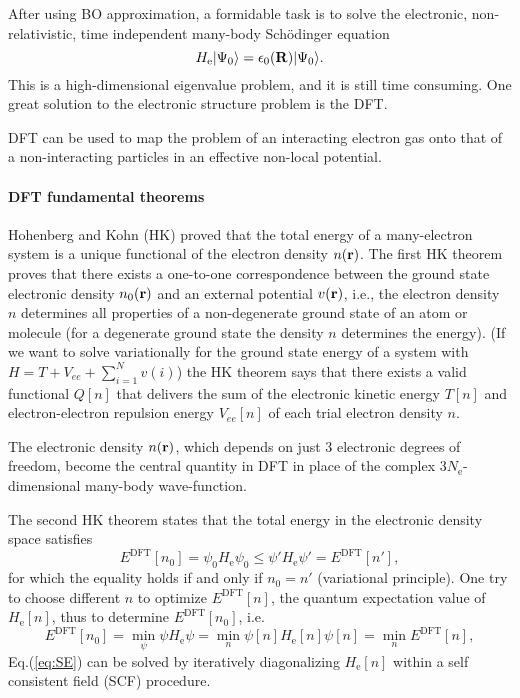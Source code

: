 After using BO approximation, a formidable task is to solve the electronic, non-relativistic, time independent many-body Sch\"{o}dinger equation
\begin{equation}
H_{\text{e}} |\Psi_0 \rangle = \epsilon_0({\bf R})|\Psi_0 \rangle.
\label{eq:SE}
\end{equation}
This is a high-dimensional eigenvalue problem, and it is still time consuming. 
One great solution to the electronic structure problem is the DFT\cite{HK64,Kohn1965}.

DFT can be used to map the problem of an interacting electron gas onto that of a non-interacting particles in an effective non-local 
potential\cite{MCP92}. 

\paragraph{DFT fundamental theorems}
Hohenberg and Kohn (HK) proved that the total energy of a many-electron system is a unique functional of the electron density $n(\bf r)$.
The first HK theorem proves that there exists a one-to-one correspondence between the ground state electronic density $n_0(\bf r)$ 
and an external potential $v(\bf r)$, i.e., the electron density  $n$ determines all
properties of a non-degenerate ground state of an atom or molecule (for a degenerate 
ground state the density $n$ determines the energy).
(If we want to solve variationally for the ground state energy of a system with $H=T + V_{ee}+\sum_{i=1}^N v(i)$) the 
HK theorem says that there exists a valid functional $Q[n]$ that delivers the sum of the electronic kinetic energy $T[n]$ 
and electron-electron repulsion energy $V_{ee}[n]$ of each trial electron density $n$\cite{Levy1979}.

The electronic density $n(\bf r)$, which depends on just 3 electronic degrees of freedom, become the central quantity in DFT 
in place of the complex $3N_{\text{e}}$-dimensional many-body wave-function.

The second HK theorem states that the total energy in the electronic density space satisfies
\begin{equation}
        E^{\text{DFT}}[n_0]= \psi_0  H_{\text{e}} \psi_0 \leq \psi' H_{\text{e}} \psi' =E^{\text{DFT}}[n'],
\label{eq:HK2}
\end{equation}
for which the equality holds if and only if $n_0=n'$ (variational principle).
One try to choose different $n$ to optimize $E^{\text{DFT}}[n]$, the quantum expectation value of $H_{\text{e}}[n]$, thus to determine $E^{\text{DFT}}[n_0]$, i.e.
\begin{equation}
E^{\text{DFT}}[n_0]= \min\limits_{\psi} \psi  H_{\text{e}} \psi  = \min\limits_{n}\psi[n]H_{\text{e}}[n]\psi[n] =\min\limits_{n}E^{\text{DFT}}[n],
\label{eq:var}
\end{equation}
Eq.\thinspace(\ref{eq:SE}) can be solved by iteratively diagonalizing $H_{\text{e}}[n]$ within a self consistent field (SCF) procedure.

